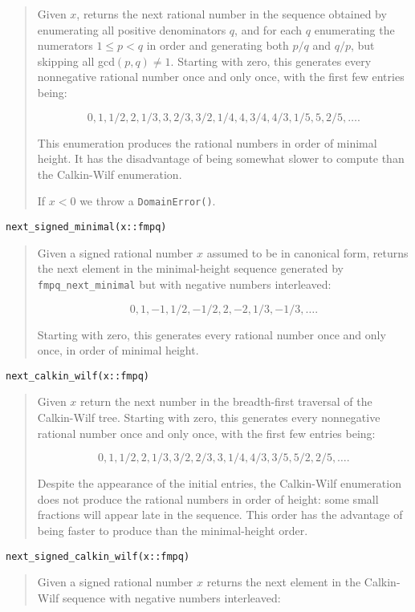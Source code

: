 \documentclass[a4paper,10pt]{article}
\newcommand{\code}{\lstinline}
\newcommand{\desc}[1]{\vspace{-3mm}\begin{quote}#1\end{quote}}
\begin{document}
{{\desc{Given $x$, returns the next rational number in the sequence obtained by
enumerating all positive denominators $q$, and for each $q$ enumerating
the numerators $1 \le p < q$ in order and generating both $p/q$ and $q/p$,
but skipping all gcd$(p,q) \neq 1$. Starting with zero, this generates
every nonnegative rational number once and only once, with the first
few entries being:

$$0, 1, 1/2, 2, 1/3, 3, 2/3, 3/2, 1/4, 4, 3/4, 4/3, 1/5, 5, 2/5, \ldots.$$

This enumeration produces the rational numbers in order of minimal height. 
It has the disadvantage of being somewhat slower to compute than the
Calkin-Wilf enumeration.

If $x < 0$ we throw a \code{DomainError()}.}

\begin{lstlisting}
next_signed_minimal(x::fmpq)
\end{lstlisting}

\desc{Given a signed rational number $x$ assumed to be in canonical form, 
returns the next element in the minimal-height sequence generated by 
\code{fmpq_next_minimal} but with negative numbers interleaved:

$$0, 1, -1, 1/2, -1/2, 2, -2, 1/3, -1/3, \ldots.$$

Starting with zero, this generates every rational number once and only once,
in order of minimal height.}

\begin{lstlisting}
next_calkin_wilf(x::fmpq)
\end{lstlisting}

\desc{Given $x$ return the next number in the breadth-first traversal of the
Calkin-Wilf tree. Starting with zero, this generates every nonnegative
rational number once and only once, with the first few entries being:

$$0, 1, 1/2, 2, 1/3, 3/2, 2/3, 3, 1/4, 4/3, 3/5, 5/2, 2/5, \ldots.$$

Despite the appearance of the initial entries, the Calkin-Wilf enumeration 
does not produce the rational numbers in order of height: some small fractions
will appear late in the sequence. This order has the advantage of being faster 
to produce than the minimal-height order.}

\begin{lstlisting}
next_signed_calkin_wilf(x::fmpq)
\end{lstlisting}

\desc{Given a signed rational number $x$ returns the next element in the
Calkin-Wilf sequence with negative numbers interleaved:

}}}
\end{document}
